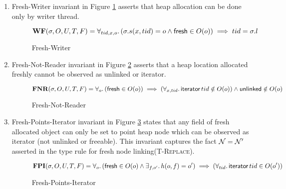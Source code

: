 \begin{enumerate}
\item{Fresh-Writer} invariant in Figure \ref{fig:fmut} asserts that heap allocation can be done only by writer thread.
  \begin{figure}[!htb]
  \[
\textbf{WF}(\sigma,O,U,T,F) =
 \forall_{tid,x,o} \ldotp (\sigma.s(x,tid) = o \land \textsf{fresh} \in O(o) ) \implies  tid = \sigma.l 
\]
\caption{Fresh-Writer}
\label{fig:fmut}
  \end{figure}
\item{Fresh-Not-Reader} invariant in Figure \ref{fig:fnotreader} asserts that a heap location allocated freshly cannot be observed as \textsf{unlinked} or \textsf{iterator}.
  \begin{figure}[!htb]
  \[
\textbf{FNR}(\sigma,O,U,T,F) =
 \forall_{o} \ldotp (\textsf{fresh} \in O(o) ) \implies  (\forall_{x,tid} \ldotp \textsf{iterator}\,tid  \notin O(o)  ) \land \textsf{unlinked} \notin O(o) 
\]
\caption{Fresh-Not-Reader}
\label{fig:fnotreader}
  \end{figure}
\item{Fresh-Points-Iterator} invariant in Figure \ref{fig:fsinglefield} states that any field of fresh allocated object can only be set to point heap node which can be observed as \textsf{iterator} (not \textsf{unlinked or freeable}).  This invariant captures the fact $\mathcal{N} = \mathcal{N}'$ asserted in the type rule for fresh node linking(\textsc{T-Replace}). 
  \begin{figure}[!htb]
  \[
\textbf{FPI}(\sigma,O,U,T,F) =
 \forall_{o} \ldotp (\textsf{fresh} \in O(o)  \land \exists_{f,o'}\ldotp h(o,f)=o') \implies (\forall_{tid} \ldotp  \textsf{iterator}\,tid \in O(o')) 
\]
\caption{Fresh-Points-Iterator}
\label{fig:fsinglefield}
  \end{figure}
   

\end{enumerate}
